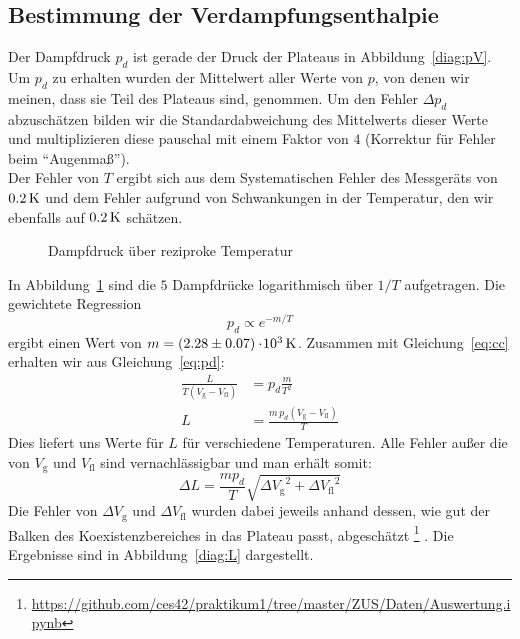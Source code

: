 \subsection{Bestimmung der Verdampfungsenthalpie}

Der Dampfdruck $p_d$ ist gerade der Druck der Plateaus in Abbildung~\ref{diag:pV}. Um $p_d$ zu erhalten wurden der Mittelwert aller Werte von $p$, von denen wir meinen, dass sie Teil des Plateaus sind, genommen. Um den Fehler $\Delta p_d$ abzuschätzen bilden wir die Standardabweichung des Mittelwerts dieser Werte und multiplizieren diese pauschal mit einem Faktor von $4$ (Korrektur für Fehler beim "`Augenmaß"'). \\
%
Der Fehler von $T$ ergibt sich aus dem Systematischen Fehler des Messgeräts von $\unit[0.2]{K}$ und dem Fehler aufgrund von Schwankungen in der Temperatur, den wir ebenfalls auf $\unit[0.2]{K}$ schätzen.
%
\begin{figure}    
    
    \caption{Dampfdruck über reziproke Temperatur}
    \label{diag:arr}
\end{figure}
%
In Abbildung~\ref{diag:arr} sind die $5$ Dampfdrücke logarithmisch über $1/T$ aufgetragen. Die gewichtete Regression
%
\begin{equation}
p_d \propto e^{-m/T} \label{eq:pd}
\end{equation}
%
ergibt einen Wert von $m = \unit[(2.28 \pm 0.07)\e3]{K}$. Zusammen mit Gleichung~\ref{eq:cc} erhalten wir aus Gleichung~\ref{eq:pd}:
\begin{align*}
    \frac{L}{T (V_\mathrm{g} - V_\mathrm{fl})} &= p_d \frac{m}{T^2} \\
                                             L &= \frac{m \, p_d (V_\mathrm{g} - V_\mathrm{fl})}{T}
\end{align*}
%
Dies liefert uns Werte für $L$ für verschiedene Temperaturen. Alle Fehler außer die von $V_\mathrm{g}$ und $V_\mathrm{fl}$ sind vernachlässigbar und man erhält somit:
\[
    \Delta L = \frac{m p_d}{T} \sqrt{{\Delta V_\mathrm{g}}^2 + {\Delta V_\mathrm{fl}}^2}
\]
Die Fehler von $\Delta V_\mathrm{g}$ und $\Delta V_\mathrm{fl}$ wurden dabei jeweils anhand dessen, wie gut der Balken des Koexistenzbereiches in das Plateau passt, abgeschätzt%
\footnote{\url{https://github.com/ces42/praktikum1/tree/master/ZUS/Daten/Auswertung.ipynb}}%
. Die Ergebnisse sind in Abbildung~\ref{diag:L} dargestellt.

